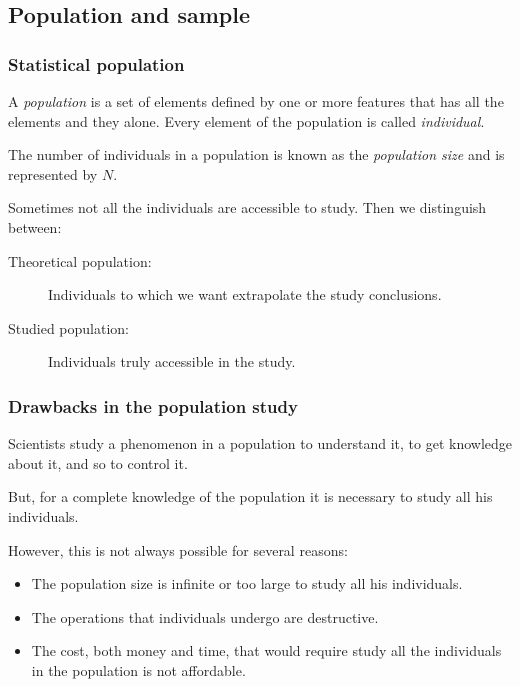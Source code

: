 \subsection{Population and sample}
\begin{frame}
\frametitle{Statistical population}
\begin{definition}[Population]
A \emph{population} is a set of elements defined by one or more features that has all the elements and they alone.
Every element of the population is called \emph{individual}.
\end{definition}

\begin{definition}
The number of individuals in a population is known as the \emph{population size} and is represented by $N$.
\end{definition}

Sometimes not all the individuals are accessible to study. 
Then we distinguish between:
\begin{description}
\item [Theoretical population:] Individuals to which we want extrapolate the study conclusions.
\item [Studied population:] Individuals truly accessible in the study.
\end{description}
\end{frame}


\begin{frame}
\frametitle{Drawbacks in the population study}
Scientists study a phenomenon in a population to understand it, to get knowledge about it, and so to control it.

But, for a complete knowledge of the population it is necessary to study all his individuals.

However, this is not always possible for several reasons:
\begin{itemize}
\item The population size is infinite or too large to study all his individuals.  
\item The operations that individuals undergo are destructive.
\item The cost, both money and time, that would require study all the individuals in the population is not affordable. 
\end{itemize}
\end{frame}


